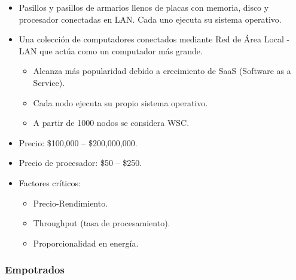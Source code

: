 \documentclass[12pt, twoside, openright]{report} %
\begin{document}
    \begin{itemize}
    
    \item
      Pasillos y pasillos de armarios llenos de placas con memoria,
      disco y procesador conectadas en LAN. Cada uno ejecuta su sistema
      operativo.
    \item
      Una colección de computadores conectados mediante Red de Área
      Local - LAN que actúa como un computador más grande.

      \begin{itemize}
      
      \item
        Alcanza más popularidad debido a crecimiento de SaaS (Software
        as a Service).
      \item
        Cada nodo ejecuta su propio sistema operativo.
      \item
        A partir de 1000 nodos se considera WSC.
      \end{itemize}
    \item
      Precio: \$100,000 -- \$200,000,000.
    \item
      Precio de procesador: \$50 -- \$250.
    \item
      Factores críticos:

      \begin{itemize}
      
      \item
        Precio-Rendimiento.
      \item
        Throughput (tasa de procesamiento).
      \item
        Proporcionalidad en energía.
      \end{itemize}
    \end{itemize}
    
    \subsubsection{Empotrados}
\end{document}
